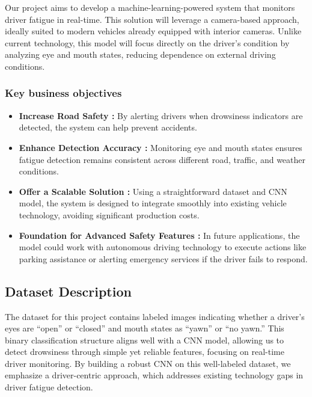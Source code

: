 \documentclass{modeleRapport}
\begin{document}
Our project aims to develop a machine-learning-powered system that monitors driver fatigue in real-time. This solution will leverage a camera-based approach, ideally suited to modern vehicles already equipped with interior cameras. Unlike current technology, this model will focus directly on the driver’s condition by analyzing eye and mouth states, reducing dependence on external driving conditions. 

\subsubsection{Key business objectives}

\begin{itemize}

\item \textbf{Increase Road Safety :} By alerting drivers when drowsiness indicators are detected, the system can help prevent accidents. 

\item \textbf{Enhance Detection Accuracy :} Monitoring eye and mouth states ensures fatigue detection remains consistent across different road, traffic, and weather conditions. 

\item \textbf{Offer a Scalable Solution :} Using a straightforward dataset and CNN model, the system is designed to integrate smoothly into existing vehicle technology, avoiding significant production costs. 

\item \textbf{Foundation for Advanced Safety Features :} In future applications, the model could work with autonomous driving technology to execute actions like parking assistance or alerting emergency services if the driver fails to respond. 

\end{itemize}

\subsection{Dataset Description}

The dataset \cite{Dataset} for this project contains labeled images indicating whether a driver’s eyes are “open” or “closed” and mouth states as “yawn” or “no yawn.” This binary classification structure aligns well with a CNN model, allowing us to detect drowsiness through simple yet reliable features, focusing on real-time driver monitoring. By building a robust CNN on this well-labeled dataset, we emphasize a driver-centric approach, which addresses existing technology gaps in driver fatigue detection. 
\end{document}
